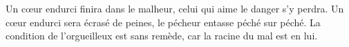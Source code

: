 Un cœur endurci finira dans le malheur,
	celui qui aime le danger s’y perdra.
Un cœur endurci sera écrasé de peines,
	le pécheur entasse péché sur péché.
La condition de l’orgueilleux est sans remède,
	car la racine du mal est en lui.
